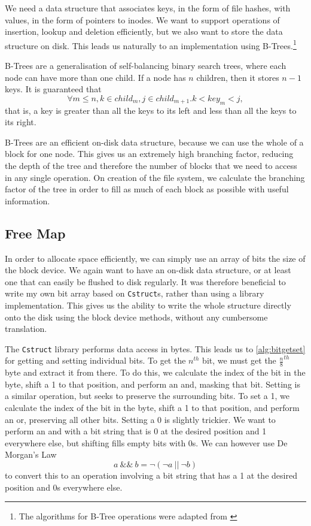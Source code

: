 \documentclass[12pt,a4paper,twoside,openright]{report}
\begin{document}
We need a data structure that associates keys, in the form of file hashes, with values, in the form of pointers to inodes. We want to support operations of insertion, lookup and deletion efficiently, but we also want to store the data structure on disk. This leads us naturally to an implementation using B-Trees.\footnote{The algorithms for B-Tree operations were adapted from \citet{CLRS09}}

B-Trees are a generalisation of self-balancing binary search trees, where each node can have more than one child. If a node has $n$ children, then it stores $n-1$ keys. It is guaranteed that $$ \forall m \leq n, k \in child_m, j \in child_{m+1} . k < key_m < j, $$ that is, a key is greater than all the keys to its left and less than all the keys to its right.

B-Trees are an efficient on-disk data structure, because we can use the whole of a block for one node. This gives us an extremely high branching factor, reducing the depth of the tree and therefore the number of blocks that we need to access in any single operation. On creation of the file system, we calculate the branching factor of the tree in order to fill as much of each block as possible with useful information.

\subsection{Free Map}
\label{subsec:freemap}

In order to allocate space efficiently, we can simply use an array of bits the size of the block device. We again want to have an on-disk data structure, or at least one that can easily be flushed to disk regularly. It was therefore beneficial to write my own bit array based on \texttt{Cstruct}s, rather than using a library implementation. This gives us the ability to write the whole structure directly onto the disk using the block device methods, without any cumbersome translation.

The \texttt{Cstruct} library performs data access in bytes. This leads us to \cref{alg:bitgetset} for getting and setting individual bits. To get the $n^{th}$ bit, we must get the $\frac{n}{8}^{th}$ byte and extract it from there. To do this, we calculate the index of the bit in the byte, shift a 1 to that position, and perform an and, masking that bit. Setting is a similar operation, but seeks to preserve the surrounding bits. To set a 1, we calculate the index of the bit in the byte, shift a 1 to that position, and perform an or, preserving all other bits. Setting a 0 is slightly trickier. We want to perform an and with a bit string that is 0 at the desired position and 1 everywhere else, but shifting fills empty bits with 0s. We can however use De Morgan's Law $$ a~\&\&~b = \neg (\neg a~||~\neg b) $$ to convert this to an operation involving a bit string that has a 1 at the desired position and 0s everywhere else.
\end{document}
